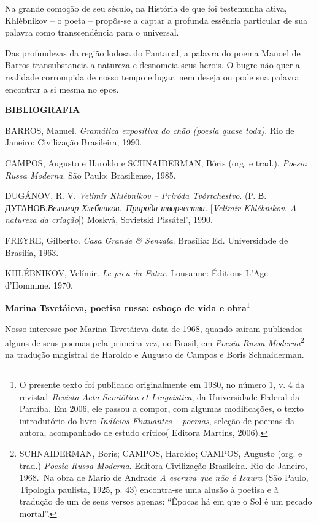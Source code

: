 Na grande comoção de seu século, na História de que foi testemunha
ativa, Khlébnikov -- o poeta -- propôs-se a captar a profunda essência
particular de sua palavra como transcendência para o universal.

Das profundezas da região lodosa do Pantanal, a palavra do poema Manoel
de Barros transubstancia a natureza e desnomeia seus herois. O bugre não
quer a realidade corrompida de nosso tempo e lugar, nem deseja ou pode
sua palavra encontrar a si mesma no epos.

\textbf{BIBLIOGRAFIA}

BARROS, Manuel. \emph{Gramática expositiva do chão (poesia quase toda)}.
Rio de Janeiro: Civilização Brasileira, 1990.

CAMPOS, Augusto e Haroldo e SCHNAIDERMAN, Bóris (org. e trad.).
\emph{Poesia Russa Moderna}. São Paulo: Brasiliense, 1985.

DUGÁNOV, R. V. \emph{Velímir Khlébnikov -- Priróda Tvórtchestvo}. (Р. В.
ДУГАНОВ.\emph{Велимир Хлебников}.~\emph{Природа творчества}.
{[}\emph{Velímir Khlébnikov. A natureza da criação}{]}) Moskvá,
Sovietski Pissátel', 1990.

FREYRE, Gilberto. \emph{Casa Grande \& Senzala}. Brasília: Ed.
Universidade de Brasilía, 1963.

KHLÉBNIKOV, Velímir. \emph{Le pieu du Futur}. Lousanne: Éditions L'Age
d'Hommme. 1970.

\textbf{Marina Tsvetáieva, poetisa russa: esboço de vida e
obra}\footnote{O presente texto foi publicado originalmente em 1980, no
  número 1, v. 4 da revista1 \emph{Revista Acta Semiótica et
  Lingvistica}, da Universidade Federal da Paraíba. Em 2006, ele passou
  a compor, com algumas modificações, o texto introdutório do livro
  \emph{Indícios Flutuantes -- poemas}, seleção de poemas da autora,
  acompanhado de estudo crítico( Editora Martins, 2006).}

Nosso interesse por Marina Tsvetáieva data de 1968, quando saíram
publicados alguns de seus poemas pela primeira vez, no Brasil, em
\emph{Poesia Russa Moderna}\footnote{SCHNAIDERMAN, Boris; CAMPOS,
  Haroldo; CAMPOS, Augusto (org. e trad.) \emph{Poesia Russa Moderna}.
  Editora Civilização Brasileira. Rio de Janeiro, 1968.~Na obra de Mario
  de Andrade \emph{A escrava que não é Isaura} (São Paulo, Tipologia
  paulista, 1925, p. 43) encontra-se uma alusão à poetisa e à tradução
  de um de seus versos apenas: ``Épocas há em que o Sol é um pecado
  mortal''.} na tradução magistral de Haroldo e Augusto de Campos e
Boris Schnaiderman.

